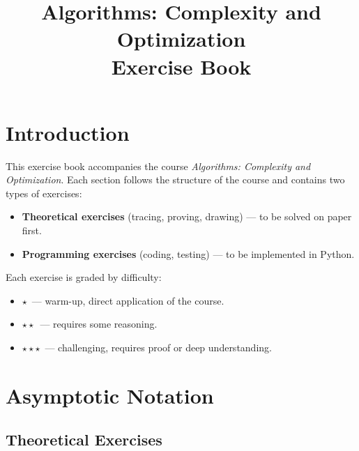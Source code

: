 \documentclass[11pt,a4paper]{article}
\title{\textbf{Algorithms: Complexity and Optimization}\\
\large Exercise Book}
\author{}
\date{}
\newcommand{\easy}{$\star$}
\newcommand{\medium}{$\star\star$}
\newcommand{\hard}{$\star\star\star$}
\begin{document}
\maketitle

\tableofcontents
\newpage

\section*{Introduction}

This exercise book accompanies the course \emph{Algorithms: Complexity and Optimization}. Each section follows the structure of the course and contains two types of exercises:
\begin{itemize}
    \item \textbf{Theoretical exercises} (tracing, proving, drawing) --- to be solved on paper first.
    \item \textbf{Programming exercises} (coding, testing) --- to be implemented in Python.
\end{itemize}

Each exercise is graded by difficulty:
\begin{itemize}
    \item \easy\ --- warm-up, direct application of the course.
    \item \medium\ --- requires some reasoning.
    \item \hard\ --- challenging, requires proof or deep understanding.
\end{itemize}

\newpage

\section{Asymptotic Notation}

\subsection{Theoretical Exercises}
\end{document}

